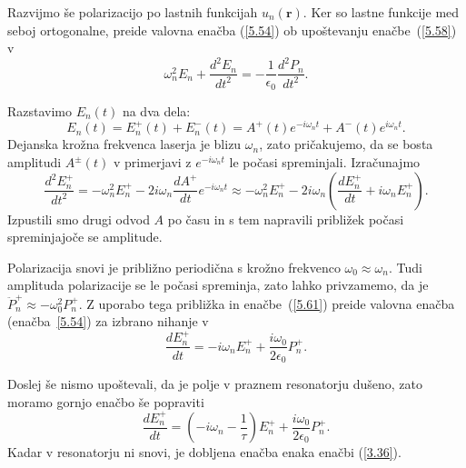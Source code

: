 Razvijmo še polarizacijo po lastnih funkcijah $u_n(\mathbf{r})$. 
Ker so lastne funkcije med seboj ortogonalne, preide valovna enačba (\ref{5.54}) 
ob upoštevanju enačbe~(\ref{5.58}) v 
\begin{equation}  
\label{5.59}
\omega_n^2 E_n+\frac{d^2 E_n}{dt^2}= 
-\frac{1}{\epsilon_0}\frac{d^2P_n}{dt^2}.
\end{equation}

Razstavimo $E_n(t)$ na dva dela: 
\begin{equation}  \label{5.60}
E_n(t)=E_n^+(t)+E_n^-(t)=A^+(t)e^{-i
\omega_nt}+A^-(t)e^{i \omega_nt}.
\end{equation}
Dejanska krožna frekvenca laserja je blizu $\omega_n$, zato pričakujemo,
da se bosta amplitudi $A^{\pm}(t)$ v primerjavi z $e^{-i \omega_nt}$ le
počasi spreminjali. Izračunajmo 
\begin{equation}  
\label{5.61}
\frac{d^2 E_n^+}{dt^2}=-\omega_n^2 E_n^+ - 2i \omega_n 
\frac{dA^+}{dt} e^{-i \omega_nt} \approx 
-\omega_n^2 E_n^+-2i \omega_n\left(\frac{dE_n^+}{dt}+
i \omega_nE_n^+\right).
\end{equation}
Izpustili smo drugi odvod $A$ po času in s tem napravili približek počasi spreminjajoče se amplitude.

Polarizacija snovi je približno periodična s krožno frekvenco $\omega_0 \approx \omega_n$.
Tudi amplituda polarizacije se le počasi spreminja, zato lahko privzamemo, da je 
$\ddot{P}_n^+ \approx - \omega_0^2 P_n^+$. Z uporabo tega
približka in enačbe~(\ref{5.61}) preide valovna enačba (enačba~\ref{5.54}) za izbrano nihanje v 
\begin{equation}  
\label{5.62}
\frac{dE_n^+}{dt}=-i \omega_n E_n^++
\frac{i \omega_0}{2\epsilon_0}P_n^+.
\end{equation}

Doslej še nismo upoštevali, da je polje v praznem resonatorju dušeno, zato
moramo gornjo enačbo še popraviti
\begin{equation}  
\label{5.63}
\frac{dE_n^+}{dt}=\left(-i \omega_n-\frac{1}{\tau}\right) E_n^+ 
+\frac{i \omega_0}{2\epsilon_0}P_n^+.
\end{equation}
Kadar v resonatorju ni snovi, je dobljena enačba enaka enačbi (\ref{3.36}).


